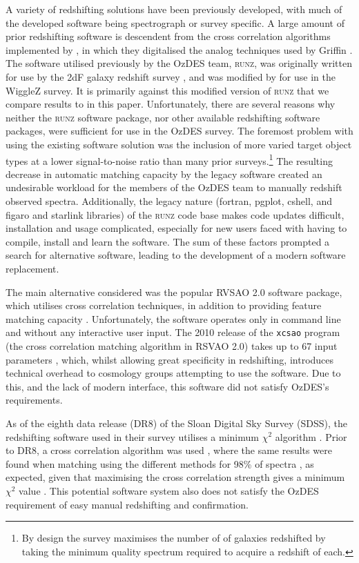 \documentclass[5p]{elsarticle}
\newcommand{\runz}{\textsc{runz}}
\begin{document}
A variety of redshifting solutions have been previously developed, with much of the developed software being spectrograph or survey specific. A large amount of prior redshifting software is descendent from the cross correlation algorithms implemented by \citet{TonryDavis1979}, in which they digitalised the analog techniques used by Griffin \cite{griffin1967photoelectric}. The software utilised previously by the OzDES team,  \runz{}, was originally written for use by the 2dF galaxy redshift survey \citep{colless2001}, and was modified by \citet{saunders2004} for use in the WiggleZ survey. It is primarily against this modified version of \runz{} that we compare results to in this paper.  Unfortunately, there are several reasons why neither the \runz{} software package, nor other available redshifting software packages, were sufficient for use in the OzDES survey. The foremost problem with using the existing software solution was the inclusion of more varied target object types at a lower signal-to-noise ratio than many prior surveys.\footnote{By design the survey maximises the number of of galaxies redshifted by taking the minimum quality spectrum required to acquire a redshift of each.}  The resulting decrease in automatic matching capacity by the legacy software created an undesirable workload for the members of the OzDES team to manually redshift observed spectra. Additionally, the legacy nature (fortran, pgplot, cshell, and figaro and starlink libraries) of the \runz{} code base makes code updates difficult, installation and usage complicated, especially for new users faced with having to compile, install and learn the software. The sum of these factors prompted a search for alternative software, leading to the development of a modern software replacement.

The main alternative considered was the popular RVSAO 2.0 software package, which utilises cross correlation techniques, in addition to providing feature matching capacity \citep{kurtz1998rvsao}. Unfortunately, the software operates only in command line and without any interactive user input. The 2010 release of the \verb+xcsao+ program (the cross correlation matching algorithm in RSVAO 2.0) takes up to 67 input parameters \citep{parameters2}, which, whilst allowing great specificity in redshifting, introduces technical overhead to cosmology groups attempting to use the software. Due to this, and the lack of modern interface, this software did not satisfy OzDES's requirements.

As of the eighth data release (DR8) of the Sloan Digital Sky Survey (SDSS), the redshifting software used in their survey utilises a minimum $\chi^2$ algorithm \citep{aihara2011eighth}. Prior to DR8, a cross correlation algorithm was used  \citep{sdss6}, where the same results were found when matching using the different methods for 98\% of spectra \cite{aihara2011eighth}, as expected, given that maximising the cross correlation strength gives a minimum $\chi^2$ value \citep{GlazebrookOfferDeeley1998}. This potential software system also does not satisfy the OzDES requirement of easy manual redshifting and confirmation. 
\end{document}
